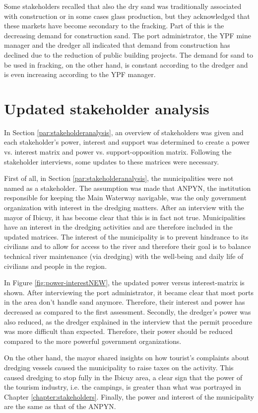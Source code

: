 Some stakeholders recalled that also the dry sand was traditionally associated with construction or in some cases glass production, but they acknowledged that these markets have become secondary to the fracking. Part of this is the decreasing demand for construction sand. The port administrator, the YPF mine manager and the dredger all indicated that demand from construction has declined due to the reduction of public building projects. The demand for sand to be used in fracking, on the other hand, is constant according to the dredger and is even increasing according to the YPF manager.

\section{Updated stakeholder analysis}
In Section \ref{par:stakeholderanalysis}, an overview of stakeholders was given and each stakeholder's power, interest and support was determined to create a power vs. interest matrix and power vs. support-opposition matrix. Following the stakeholder interviews, some updates to these matrices were necessary.

First of all, in Section \ref{par:stakeholderanalysis}, the municipalities were not named as a stakeholder. The assumption was made that ANPYN, the institution responsible for keeping the Main Waterway navigable, was the only government organization with interest in the dredging matters. After an interview with the mayor of Ibicuy, it has become clear that this is in fact not true. Municipalities have an interest in the dredging activities and are therefore included in the updated matrices. The interest of the municipality is to prevent hindrance to its civilians and to allow for access to the river and therefore their goal is to balance technical river maintenance (via dredging) with the well-being and daily life of civilians and people in the region.

In Figure \ref{fig:power-interestNEW}, the updated power versus interest-matrix is shown. After interviewing the port administrator, it became clear that most ports in the area don't handle sand anymore. Therefore, their interest and power has decreased as compared to the first assessment. Secondly, the dredger's power was also reduced, as the dredger explained in the interview that the permit procedure was more difficult than expected. Therefore, their power should be reduced compared to the more powerful government organizations.

On the other hand, the mayor shared insights on how tourist's complaints about dredging vessels caused the municipality to raise taxes on the activity. This caused dredging to stop fully in the Ibicuy area, a clear sign that the power of the tourism industry, i.e. the campings, is greater than what was portrayed in Chapter \ref{chapter:stakeholders}. Finally, the power and interest of the municipality are the same as that of the ANPYN.


